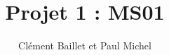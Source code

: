 \documentclass{article}
\title{Projet 1 : MS01}
\author{Clément Baillet et Paul Michel}
\date{}
\begin{document}
\maketitle

\section{}
\end{document}
